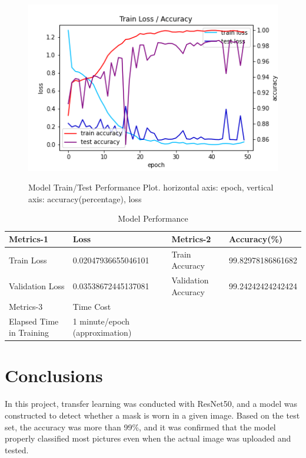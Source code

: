 \documentclass{article}
\begin{document}
\begin{figure}[H]
{		\includegraphics[scale=0.26]{images/train_test_without_momentum.png}
	}
	
	\caption{Model Train/Test Performance Plot. horizontal axis: epoch, vertical axis: accuracy(percentage), loss}
	\label{edafig}
\end{figure}

\begin{table}[h!]
	\centering
	
	\begin{tabular}{l|l|l|l}
		\toprule
		Metrics-1 & Loss & Metrics-2 & Accuracy(\%) \\
		\midrule
		Train Loss & 0.02047936655046101 & Train Accuracy & 99.82978186861682 \\
		Validation Loss & 0.03538672445137081 & Validation Accuracy & 99.24242424242424 \\
        
        \toprule
		Metrics-3 & Time Cost \\
		\midrule
        Elapsed Time in Training & 1 minute/epoch (approximation) \\
		\bottomrule
	\end{tabular}

	\vspace{0.2cm}
	\caption{Model Performance}
	\label{modelcomp}
\end{table}

\section{Conclusions}
In this project, transfer learning was conducted with ResNet50, and a model was constructed to detect whether a mask is worn in a given image.
Based on the test set, the accuracy was more than 99\%, and it was confirmed that the model properly classified most pictures even when the actual image was uploaded and tested.
\end{document}
